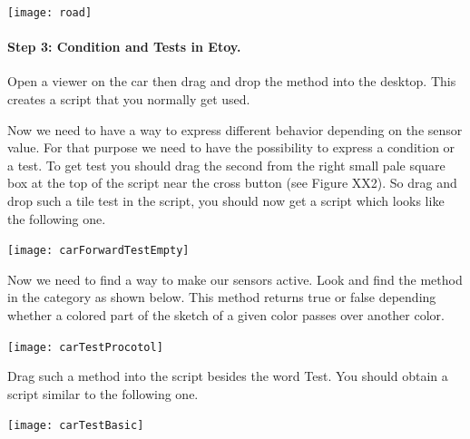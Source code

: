 \begin{center}\texttt{[image: road]}\end{center}

\paragraph{Step 3: Condition and Tests in Etoy.}
Open a viewer on the car then drag and drop the method  into the desktop. This creates a script that you normally get used. 

Now we need to have a way to express different behavior depending on the sensor value. For that purpose we need to have the possibility to express a condition or a test. To get test you should drag the second from the right small pale square box at the top of the script near the cross button (see Figure XX2). So drag and drop such a tile test in the script, you should now get a script which looks 
like the following one.
\begin{center}\texttt{[image: carForwardTestEmpty]}\end{center}

Now we need to find a way to make our sensors active. Look and find the method  in the category  as shown below. This method returns true or false depending whether a colored part of the sketch of a given color passes over another color. 
\begin{center}\texttt{[image: carTestProcotol]}\end{center} 

Drag such a method into the script besides the word Test. You should obtain a script similar to the following one. 
\begin{center}\texttt{[image: carTestBasic]}\end{center}


